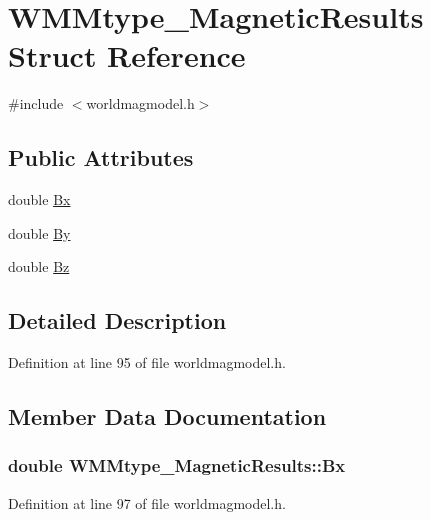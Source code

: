 \hypertarget{struct_w_m_mtype___magnetic_results}{\section{\-W\-M\-Mtype\-\_\-\-Magnetic\-Results \-Struct \-Reference}
\label{struct_w_m_mtype___magnetic_results}
}


{\ttfamily \#include $<$worldmagmodel.\-h$>$}

\subsection*{\-Public \-Attributes}
\begin{DoxyCompactItemize}
\item 
double \hyperlink{struct_w_m_mtype___magnetic_results_ae80af48fa6b9a867ae9557912556d0d8}{\-Bx}
\item 
double \hyperlink{struct_w_m_mtype___magnetic_results_a6286c091a759e02d19c27d928e391eff}{\-By}
\item 
double \hyperlink{struct_w_m_mtype___magnetic_results_a7b18c4cd4a4e446b117fff1f842cee83}{\-Bz}
\end{DoxyCompactItemize}


\subsection{\-Detailed \-Description}


\-Definition at line 95 of file worldmagmodel.\-h.



\subsection{\-Member \-Data \-Documentation}
\hypertarget{struct_w_m_mtype___magnetic_results_ae80af48fa6b9a867ae9557912556d0d8}{
\subsubsection[{\-Bx}]{\setlength{\rightskip}{0pt plus 5cm}double {\bf \-W\-M\-Mtype\-\_\-\-Magnetic\-Results\-::\-Bx}}}\label{struct_w_m_mtype___magnetic_results_ae80af48fa6b9a867ae9557912556d0d8}


\-Definition at line 97 of file worldmagmodel.\-h.

